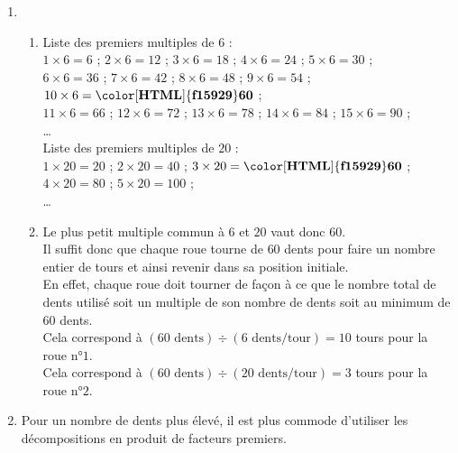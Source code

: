\begin{corrige}
        \begin{enumerate}
            \item 
            \begin{enumerate}
                \item Liste des premiers multiples de $6$ : \\
                $1\times6 = 6$ ; $2\times6 = 12$ ; $3\times6 = 18$ ; $4\times6 = 24$ ; $5\times6 = 30$ ; \\
                $6\times6 = 36$ ; $7\times6 = 42$ ; $8\times6 = 48$ ; $9\times6 = 54$ ; $10\times6 = \mathbf{{\color[HTML]{f15929}60}}$ ; \\
                $11\times6 = 66$ ; $12\times6 = 72$ ; $13\times6 = 78$ ; $14\times6 = 84$ ; $15\times6 = 90$ ; \\
                \dots \\
                Liste des premiers multiples de $20$ : \\
                $1\times20 = 20$ ; $2\times20 = 40$ ; $3\times20 = \mathbf{{\color[HTML]{f15929}60}}$ ; $4\times20 = 80$ ; $5\times20 = 100$ ; \\      
                \dots \\
                \medskip
                \item Le plus petit multiple commun à $6$ et $20$ vaut donc $60$.\\
                Il suffit donc que chaque roue tourne de $60$ dents pour faire un nombre entier de tours et ainsi revenir dans sa position initiale.\\
                En effet, chaque roue doit tourner de façon à ce que le nombre total de dents utilisé soit un multiple de son nombre
                de dents soit au minimum de $60$ dents.\\
                 Cela correspond à $(60\text{ dents})\div (6\text{ dents/tour}) = 10$ tours pour la roue n°$1$.\\
                Cela correspond à $(60\text{ dents})\div (20\text{ dents/tour}) = 3$ tours pour la roue n°$2$.
            \end{enumerate}
            \item Pour un nombre de dents plus élevé, il est plus commode d'utiliser les décompositions en produit de facteurs premiers.\\

\end{enumerate}
\end{corrige}

